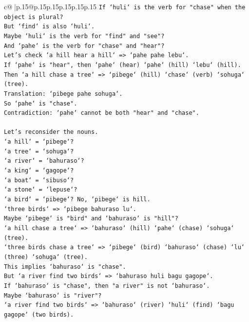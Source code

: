 \documentclass{article}
\begin{document}
{\begin{supertabular}{c@{$\;$}|p{.15\linewidth}@{}p{.15\linewidth}p{.15\linewidth}p{.15\linewidth}p{.15\linewidth}p{.15\linewidth}}
{{{\texttt{If `huli` is the verb for "chase" when the object is plural?} \\
\texttt{But `find` is also `huli`.} \\
\texttt{Maybe `huli` is the verb for "find" and "see"?} \\
\texttt{And `pahe` is the verb for "chase" and "hear"?} \\
\texttt{Let's check `a hill hear a hill` => `pahe pahe lebu`.} \\
\texttt{If `pahe` is "hear", then `pahe` (hear) `pahe` (hill) `lebu` (hill).} \\
\texttt{Then `a hill chase a tree` => `pibege` (hill) `chase` (verb) `sohuga` (tree).} \\
\texttt{Translation: `pibege pahe sohuga`.} \\
\texttt{So `pahe` is "chase".} \\
\texttt{Contradiction: `pahe` cannot be both "hear" and "chase".} \\
\\ 
\texttt{Let's reconsider the nouns.} \\
\texttt{`a hill` = `pibege`?} \\
\texttt{`a tree` = `sohuga`?} \\
\texttt{`a river` = `bahuraso`?} \\
\texttt{`a king` = `gagope`?} \\
\texttt{`a boat` = `sibuso`?} \\
\texttt{`a stone` = `lepuse`?} \\
\texttt{`a bird` = `pibege`? No, `pibege` is hill.} \\
\texttt{`three birds` => `pibege bahuraso lu`.} \\
\texttt{Maybe `pibege` is "bird" and `bahuraso` is "hill"?} \\
\texttt{`a hill chase a tree` => `bahuraso` (hill) `pahe` (chase) `sohuga` (tree).} \\
\texttt{`three birds chase a tree` => `pibege` (bird) `bahuraso` (chase) `lu` (three) `sohuga` (tree).} \\
\texttt{This implies `bahuraso` is "chase".} \\
\texttt{But `a river find two birds` => `bahuraso huli bagu gagope`.} \\
\texttt{If `bahuraso` is "chase", then "a river" is not `bahuraso`.} \\
\texttt{Maybe `bahuraso` is "river"?} \\
\texttt{`a river find two birds` => `bahuraso` (river) `huli` (find) `bagu gagope` (two birds).} \\
}}}
\end{supertabular}}
\end{document}
